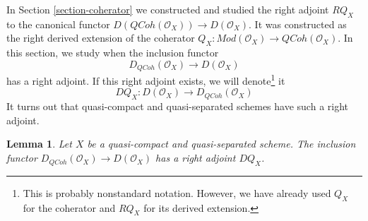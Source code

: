\documentclass{stacks-project}
\theoremstyle{plain}
\newtheorem{lemma}[subsection]{Lemma}
\theoremstyle{definition}
\theoremstyle{remark}
\numberwithin{equation}{subsection}
\def\QCoh{\mathit{QCoh}}
\begin{document}
\noindent
In Section \ref{section-coherator} we constructed and studied
the right adjoint $RQ_X$ to the canonical functor
$D(\QCoh(\mathcal{O}_X)) \to D(\mathcal{O}_X)$.
It was constructed as the right derived extension of the coherator
$Q_X : \textit{Mod}(\mathcal{O}_X) \to \QCoh(\mathcal{O}_X)$.
In this section, we study when the inclusion functor
$$
D_\QCoh(\mathcal{O}_X) \longrightarrow D(\mathcal{O}_X)
$$
has a right adjoint. If this right adjoint exists, we will
denote\footnote{This is probably nonstandard notation. However, we have already
used $Q_X$ for the coherator and $RQ_X$ for its derived extension.} it
$$
DQ_X :
D(\mathcal{O}_X) \longrightarrow D_\QCoh(\mathcal{O}_X)
$$
It turns out that quasi-compact and quasi-separated
schemes have such a right adjoint.

\begin{lemma}
\label{lemma-better-coherator}
Let $X$ be a quasi-compact and quasi-separated scheme.
The inclusion functor $D_\QCoh(\mathcal{O}_X) \to D(\mathcal{O}_X)$
has a right adjoint $DQ_X$.
\end{lemma}
\end{document}
